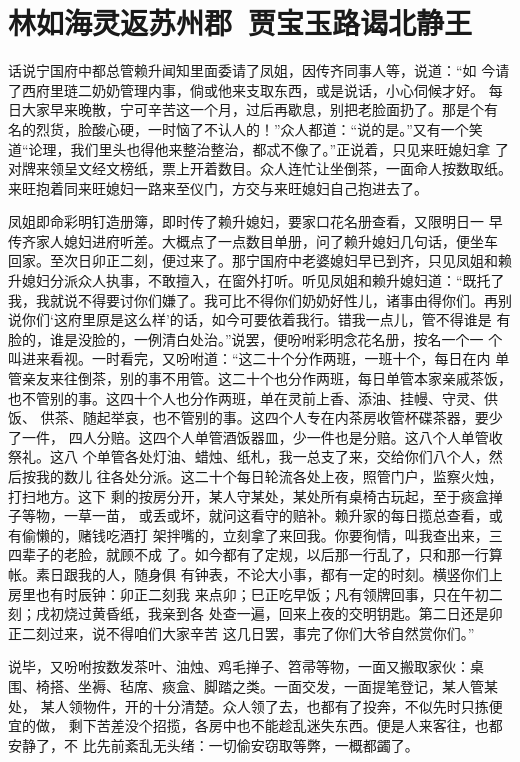 \chapter{林如海灵返苏州郡~贾宝玉路谒北静王}

话说宁国府中都总管赖升闻知里面委请了凤姐，因传齐同事人等，说道：“如
今请了西府里琏二奶奶管理内事，倘或他来支取东西，或是说话，小心伺候才好。
每日大家早来晚散，宁可辛苦这一个月，过后再歇息，别把老脸面扔了。那是个有
名的烈货，脸酸心硬，一时恼了不认人的！”众人都道：“说的是。”又有一个笑
道“论理，我们里头也得他来整治整治，都忒不像了。”正说着，只见来旺媳妇拿
了对牌来领呈文经文榜纸，票上开着数目。众人连忙让坐倒茶，一面命人按数取纸。
来旺抱着同来旺媳妇一路来至仪门，方交与来旺媳妇自己抱进去了。

凤姐即命彩明钉造册簿，即时传了赖升媳妇，要家口花名册查看，又限明日一
早传齐家人媳妇进府听差。大概点了一点数目单册，问了赖升媳妇几句话，便坐车
回家。至次日卯正二刻，便过来了。那宁国府中老婆媳妇早已到齐，只见凤姐和赖
升媳妇分派众人执事，不敢擅入，在窗外打听。听见凤姐和赖升媳妇道：“既托了
我，我就说不得要讨你们嫌了。我可比不得你们奶奶好性儿，诸事由得你们。再别
说你们‘这府里原是这么样’的话，如今可要依着我行。错我一点儿，管不得谁是
有脸的，谁是没脸的，一例清白处治。”说罢，便吩咐彩明念花名册，按名一个一
个叫进来看视。一时看完，又吩咐道：“这二十个分作两班，一班十个，每日在内
单管亲友来往倒茶，别的事不用管。这二十个也分作两班，每日单管本家亲戚茶饭，
也不管别的事。这四十个人也分作两班，单在灵前上香、添油、挂幔、守灵、供饭、
供茶、随起举哀，也不管别的事。这四个人专在内茶房收管杯碟茶器，要少了一件，
四人分赔。这四个人单管酒饭器皿，少一件也是分赔。这八个人单管收祭礼。这八
个单管各处灯油、蜡烛、纸札，我一总支了来，交给你们八个人，然后按我的数儿
往各处分派。这二十个每日轮流各处上夜，照管门户，监察火烛，打扫地方。这下
剩的按房分开，某人守某处，某处所有桌椅古玩起，至于痰盒掸子等物，一草一苗，
或丢或坏，就问这看守的赔补。赖升家的每日揽总查看，或有偷懒的，赌钱吃酒打
架拌嘴的，立刻拿了来回我。你要徇情，叫我查出来，三四辈子的老脸，就顾不成
了。如今都有了定规，以后那一行乱了，只和那一行算帐。素日跟我的人，随身俱
有钟表，不论大小事，都有一定的时刻。横竖你们上房里也有时辰钟：卯正二刻我
来点卯；巳正吃早饭；凡有领牌回事，只在午初二刻；戌初烧过黄昏纸，我亲到各
处查一遍，回来上夜的交明钥匙。第二日还是卯正二刻过来，说不得咱们大家辛苦
这几日罢，事完了你们大爷自然赏你们。”

说毕，又吩咐按数发茶叶、油烛、鸡毛掸子、笤帚等物，一面又搬取家伙：桌
围、椅搭、坐褥、毡席、痰盒、脚踏之类。一面交发，一面提笔登记，某人管某处，
某人领物件，开的十分清楚。众人领了去，也都有了投奔，不似先时只拣便宜的做，
剩下苦差没个招揽，各房中也不能趁乱迷失东西。便是人来客往，也都安静了，不
比先前紊乱无头绪：一切偷安窃取等弊，一概都蠲了。


